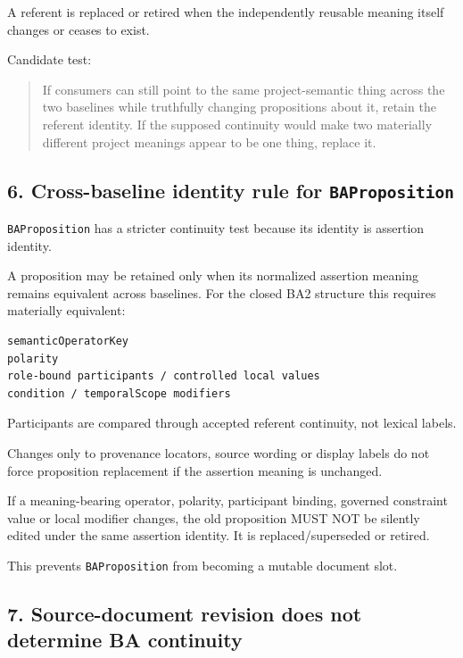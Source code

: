\documentclass[11pt,a4paper]{article}
\begin{document}
A referent is replaced or retired when the independently reusable
meaning itself changes or ceases to exist.

Candidate test:

\begin{quote}
If consumers can still point to the same project-semantic thing across
the two baselines while truthfully changing propositions about it,
retain the referent identity. If the supposed continuity would make two
materially different project meanings appear to be one thing, replace
it.
\end{quote}

\subsection{\texorpdfstring{6. Cross-baseline identity rule for
\texttt{BAProposition}}{6. Cross-baseline identity rule for BAProposition}}\label{cross-baseline-identity-rule-for-baproposition}

\texttt{BAProposition} has a stricter continuity test because its
identity is assertion identity.

A proposition may be retained only when its normalized assertion meaning
remains equivalent across baselines. For the closed BA2 structure this
requires materially equivalent:

\begin{verbatim}
semanticOperatorKey
polarity
role-bound participants / controlled local values
condition / temporalScope modifiers
\end{verbatim}

Participants are compared through accepted referent continuity, not
lexical labels.

Changes only to provenance locators, source wording or display labels do
not force proposition replacement if the assertion meaning is unchanged.

If a meaning-bearing operator, polarity, participant binding, governed
constraint value or local modifier changes, the old proposition MUST NOT
be silently edited under the same assertion identity. It is
replaced/superseded or retired.

This prevents \texttt{BAProposition} from becoming a mutable document
slot.

\subsection{7. Source-document revision does not determine BA
continuity}\label{source-document-revision-does-not-determine-ba-continuity}
\end{document}
